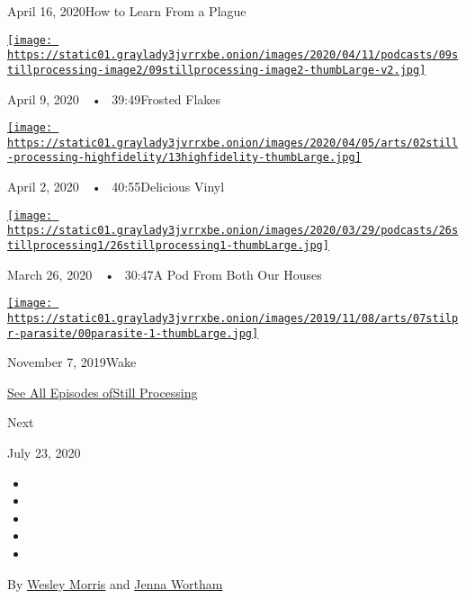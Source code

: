 April 16, 2020How to Learn From a Plague

\href{https://www.nytimes3xbfgragh.onion/2020/04/09/podcasts/still-processing-tiger-king.html?action=click\&module=audio-series-bar\&region=header\&pgtype=Article}{\texttt{[image: https://static01.graylady3jvrrxbe.onion/images/2020/04/11/podcasts/09stillprocessing-image2/09stillprocessing-image2-thumbLarge-v2.jpg]}}

April 9, 2020~~•~ 39:49Frosted Flakes

\href{https://www.nytimes3xbfgragh.onion/2020/04/02/podcasts/high-fidelity-zoe-kravitz.html?action=click\&module=audio-series-bar\&region=header\&pgtype=Article}{\texttt{[image: https://static01.graylady3jvrrxbe.onion/images/2020/04/05/arts/02still-processing-highfidelity/13highfidelity-thumbLarge.jpg]}}

April 2, 2020~~•~ 40:55Delicious Vinyl

\href{https://www.nytimes3xbfgragh.onion/2020/03/26/podcasts/still-processing-quarantine.html?action=click\&module=audio-series-bar\&region=header\&pgtype=Article}{\texttt{[image: https://static01.graylady3jvrrxbe.onion/images/2020/03/29/podcasts/26stillprocessing1/26stillprocessing1-thumbLarge.jpg]}}

March 26, 2020~~•~ 30:47A Pod From Both Our Houses

\href{https://www.nytimes3xbfgragh.onion/2019/11/07/podcasts/still-processing-parasite-watchmen-bong-joon-ho.html?action=click\&module=audio-series-bar\&region=header\&pgtype=Article}{\texttt{[image: https://static01.graylady3jvrrxbe.onion/images/2019/11/08/arts/07stilpr-parasite/00parasite-1-thumbLarge.jpg]}}

November 7, 2019Wake

\href{https://www.nytimes3xbfgragh.onion/column/still-processing-podcast}{See
All Episodes ofStill Processing}

Next

July 23, 2020

\begin{itemize}
\item
\item
\item
\item
\item
\end{itemize}

By \href{https://www.nytimes3xbfgragh.onion/by/wesley-morris}{Wesley
Morris} and
\href{https://www.nytimes3xbfgragh.onion/by/jenna-wortham}{Jenna
Wortham}

